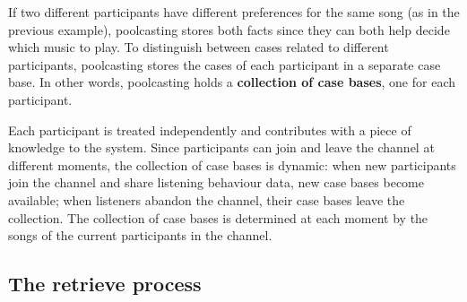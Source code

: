 If two different participants have different preferences for the same song (as in the previous example), poolcasting stores both facts since they can both help decide which music to play.
To distinguish between cases related to different participants, poolcasting stores the cases of each participant in a separate case base.
In other words, poolcasting holds a \textbf{collection of case bases}, one for each participant.


Each participant is treated independently and contributes with a piece of knowledge to the system.
Since participants can join and leave the channel at different moments, the collection of case bases is dynamic:
when new participants join the channel and share listening behaviour data, new case bases become available; when listeners abandon the channel, their case bases leave the collection.
The collection of case bases is determined at each moment by the songs of the current participants in the channel.


% 
% 
% 
 

\subsection{The retrieve process}

% 

